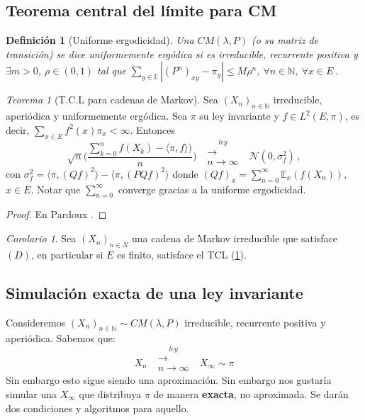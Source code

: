 \documentclass[letterpaper,11pt]{article} %
\theoremstyle{defbreak}
\newtheorem{definition}{Definición}[subsection]
\theoremstyle{propbreak}
\theoremstyle{remark}
\theoremstyle{break}
\newtheorem{theorem}{Teorema}[subsection]
\newtheorem{corolary}{Corolario}[subsection]
\def\E{\mathbb{E}}
\def\N{\mathbb{N}}
\def\normal{\mathcal{N}}
\def\convley{\mbox{ }\overset{ley}{\substack{\longrightarrow \\n \to \infty}}\mbox{ }}
\def\gris{\color{mygray}}
\def\negro{\color{black}}
\def\xcm{(X_n)_{n\in N}}
\def\cm{CM(\lambda,P)}
\begin{document}
\subsection{Teorema central del límite para CM}
\begin{definition}[Uniforme ergodicidad]
Una %
$\cm$ (o su matriz de transición) se dice uniformemente ergódica si es irreducible, recurrente positiva y $\exists m>0$, $\rho\in(0,1)$ tal que $\displaystyle\sum_{y\in\E}|(P^n)_{xy}-\pi_y|\leq M\rho^n$, $\forall n\in\N$, $\forall x\in E$\,.
\end{definition}
\begin{theorem}[T.C.L para cadenas de Markov]
\label{tcl_markov}
Sea $(X_n)_{n\in \N}$ irreducible, aperiódica y uniformemente ergódica. Sea $\pi$ su ley invariante y $f\in L^2(E,\pi)$, es decir,  $\displaystyle\sum_{x\in E}f^2(x)\pi_x<\infty$. Entonces
$$ \displaystyle \sqrt{n}\bigg(\frac{\sum^n_{k=0}f(X_k)-\langle\pi,f\rangle)}{n}\bigg)\convley\normal(0,\sigma^2_f)\,,$$
con $\sigma^2_f=\langle\pi,(Qf)^2\rangle-\langle\pi,(PQf)^2\rangle$ donde $(Qf)_x=\displaystyle\sum^\infty_{n=0}\E_x(f(X_n))$, $x\in E$.
\newline Notar que $\displaystyle\sum^\infty_{n=0}$ converge gracias a la uniforme ergodicidad.
\end{theorem}
\begin{proof}
\gris En Pardoux \cite{pardoux}.
\negro
\end{proof}
\begin{corolary}
Sea $\xcm$ una cadena de Markov irreducible que satisface $(D)$, en particular si $E$ es finito, satisface el TCL (\ref{tcl_markov}).
\end{corolary}
\subsection{Simulación exacta de una ley invariante}
Consideremos $(X_n)_{n\in \N}\sim \cm$ irreducible, recurrente positiva y aperiódica. Sabemos que:
$$ X_n\convley X_\infty\sim\pi$$
Sin embargo esto sigue siendo una aproximación. Sin embargo nos gustaría simular una $X_\infty$ que distribuya $\pi$ de manera \textbf{exacta}, no aproximada. Se darán dos condiciones y algoritmos para aquello.
\end{document}
